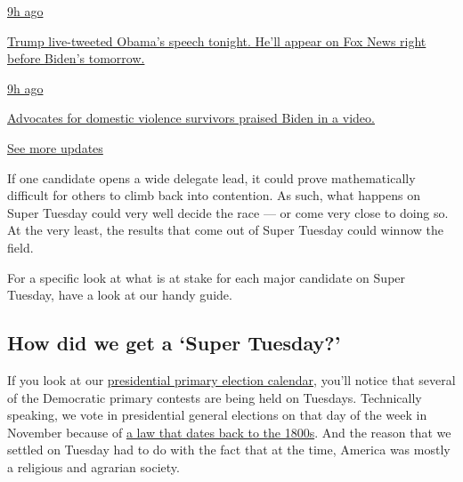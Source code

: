 \href{https://www.nytimes3xbfgragh.onion/live/2020/08/19/us/dnc-convention-election?action=click\&pgtype=Article\&state=default\&region=MAIN_CONTENT_1\&context=storylines_live_updates\#trump-live-tweeted-obamas-speech-tonight-hell-appear-on-fox-news-right-before-bidens-tomorrow}{9h
ago}

\href{https://www.nytimes3xbfgragh.onion/live/2020/08/19/us/dnc-convention-election?action=click\&pgtype=Article\&state=default\&region=MAIN_CONTENT_1\&context=storylines_live_updates\#trump-live-tweeted-obamas-speech-tonight-hell-appear-on-fox-news-right-before-bidens-tomorrow}{Trump
live-tweeted Obama's speech tonight. He'll appear on Fox News right
before Biden's tomorrow.}

\href{https://www.nytimes3xbfgragh.onion/live/2020/08/19/us/dnc-convention-election?action=click\&pgtype=Article\&state=default\&region=MAIN_CONTENT_1\&context=storylines_live_updates\#advocates-for-domestic-violence-survivors-praised-biden-in-a-video}{9h
ago}

\href{https://www.nytimes3xbfgragh.onion/live/2020/08/19/us/dnc-convention-election?action=click\&pgtype=Article\&state=default\&region=MAIN_CONTENT_1\&context=storylines_live_updates\#advocates-for-domestic-violence-survivors-praised-biden-in-a-video}{Advocates
for domestic violence survivors praised Biden in a video.}

\href{https://www.nytimes3xbfgragh.onion/live/2020/08/19/us/dnc-convention-election?action=click\&pgtype=Article\&state=default\&region=MAIN_CONTENT_1\&context=storylines_live_updates}{See
more updates}

If one candidate opens a wide delegate lead, it could prove
mathematically difficult for others to climb back into contention. As
such, what happens on Super Tuesday could very well decide the race ---
or come very close to doing so. At the very least, the results that come
out of Super Tuesday could winnow the field.

For a specific look at what is at stake for each major candidate on
Super Tuesday, have a look at our handy guide.

\hypertarget{how-did-we-get-a-super-tuesday}{%
\subsection{How did we get a `Super
Tuesday?'}\label{how-did-we-get-a-super-tuesday}}

If you look at our
\href{https://www.nytimes3xbfgragh.onion/interactive/2019/us/elections/2020-presidential-election-calendar.html}{presidential
primary election calendar}, you'll notice that several of the Democratic
primary contests are being held on Tuesdays. Technically speaking, we
vote in presidential general elections on that day of the week in
November because of
\href{https://www.loc.gov/law/help/statutes-at-large/28th-congress/session-2/c28s2ch1.pdf}{a
law that dates back to the 1800s}. And the reason that we settled on
Tuesday had to do with the fact that at the time, America was mostly a
religious and agrarian society.

